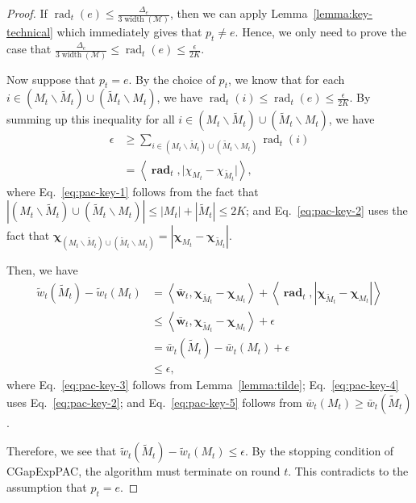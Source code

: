 \documentclass{article}
\newcommand{\AlgorithmPAC}{{\small \textsf{CGapExpPAC}}\xspace}
\newcommand{\M}{\mathcal M}
\newcommand{\del}{\backslash}
\DeclareMathOperator{\rank}{width}
\DeclareMathOperator{\rad}{rad}
\newcommand{\inn}[1]{\left\langle #1 \right\rangle}
\renewcommand{\vec}[1]{\boldsymbol{#1}}
\begin{document}
\begin{proof}
If $\rad_t(e) \le \frac{\Delta_e}{3\rank(\M)}$, then we can apply Lemma~\ref{lemma:key-technical} which immediately gives that $p_t\not= e$.
Hence, we only need to prove the case that $\frac{\Delta_e}{3\rank(\M)} \le \rad_t(e) \le \frac{\epsilon}{2K}$.

Now suppose that $p_t = e$.
By the choice of $p_t$, we know that for each $i\in (M_t\del \tilde M_t) \cup (\tilde M_t \del M_t)$, we have
$\rad_t(i) \le \rad_t(e) \le \frac{\epsilon}{2K}$.
By summing up this inequality for all $i \in (M_t\del \tilde M_t) \cup (\tilde M_t \del M_t)$, we have
\begin{align}
\epsilon &\ge \sum_{i\in (M_t\del \tilde M_t) \cup (\tilde M_t \del M_t)} \rad_t(i)\label{eq:pac-key-1} \\
		     &= \inn{\vec \rad_t, \big|\chi_{M_t}-\chi_{\tilde M_t}\big|}, \label{eq:pac-key-2}
\end{align}
where Eq.~\eqref{eq:pac-key-1} follows from the fact that
$|(M_t\del \tilde M_t) \cup (\tilde M_t \del M_t)| \le |M_t|+|\tilde M_t| \le 2K$;
and Eq.~\eqref{eq:pac-key-2} uses the fact that
$\vec \chi_{(M_t\del \tilde M_t) \cup (\tilde M_t \del M_t)} = |\vec \chi_{M_t}-\vec \chi_{\tilde M_t}|$.

Then, we have
\begin{align}
\tilde w_t(\tilde M_t) - \tilde w_t(M_t) 
&= \inn{\vec {\bar w}_t, \vec \chi_{\tilde M_t}-\vec\chi_{M_t}}+\inn{\vec \rad_t, |\vec \chi_{\tilde M_t}-\vec\chi_{M_t}|}
\label{eq:pac-key-3}\\
&\le \inn{\vec {\bar w}_t, \vec \chi_{\tilde M_t}-\vec\chi_{M_t}}+\epsilon 
\label{eq:pac-key-4}\\
&= \bar w_t(\tilde M_t)-\bar w_t(M_t)+\epsilon \nonumber\\
&\le \epsilon, \label{eq:pac-key-5}
\end{align}
where Eq.~\eqref{eq:pac-key-3} follows from Lemma~\ref{lemma:tilde};
Eq.~\eqref{eq:pac-key-4} uses Eq.~\eqref{eq:pac-key-2};
and Eq.~\eqref{eq:pac-key-5} follows from $\bar w_t(M_t)\ge \bar w_t(\tilde M_t)$.


Therefore, we see that $\tilde w_t(\tilde M_t)-\tilde w_t(M_t) \le \epsilon$.
By the stopping condition of \AlgorithmPAC, the algorithm must terminate on round $t$. 
This contradicts to the assumption that $p_t = e$.
\end{proof}
\end{document}
